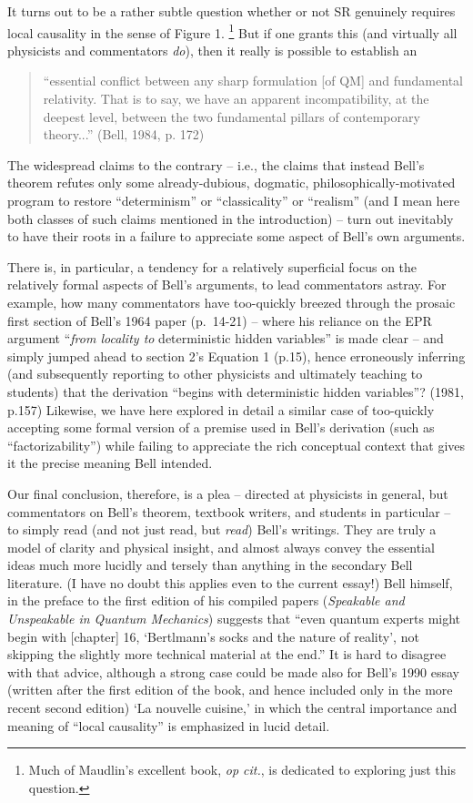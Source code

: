 \documentclass[12pt]{article}
\begin{document}
It turns out to be a rather subtle question whether or not SR
genuinely requires local causality in the sense of Figure 1.  
\footnote{Much of Maudlin's excellent book, \emph{op cit.}, is
  dedicated to exploring just this question.}
But if one grants this (and virtually all physicists and commentators
\emph{do}), then it really is possible to establish an 
\begin{quote}
``essential
conflict between any sharp formulation [of QM] and fundamental
relativity.  That is to say, we have an apparent incompatibility, at
the deepest level, between the two fundamental pillars of contemporary
theory...'' (Bell, 1984, p. 172)
\end{quote}
The widespread claims to the contrary -- i.e., the claims that instead
Bell's theorem refutes only some already-dubious, dogmatic,
philosophically-motivated program to restore ``determinism'' or
``classicality'' or ``realism'' (and I mean here both classes of such
claims mentioned in the introduction) -- turn out inevitably to have
their roots in a failure to appreciate some aspect of Bell's own
arguments.  

There is, in particular, a tendency for a relatively 
superficial focus on the relatively formal aspects of Bell's
arguments, to lead commentators astray.  For example, how many
commentators have too-quickly breezed through the prosaic first
section of Bell's 1964 paper (p.~14-21) -- where his reliance on the EPR
argument ``\emph{from locality to} deterministic hidden variables''
is made clear -- and simply jumped ahead to section 2's 
Equation 1 (p.15), hence erroneously inferring (and subsequently
reporting to other physicists and ultimately teaching to students) 
that the derivation ``begins with deterministic hidden variables''?  
(1981, p.157)  Likewise, we have here explored in detail 
a similar case of too-quickly accepting some formal version of a
premise used in Bell's derivation (such as ``factorizability'') 
while failing to appreciate the rich conceptual context that gives it
the precise meaning Bell intended.  

Our final conclusion, therefore, is a plea -- directed at physicists
in general, but commentators on Bell's theorem, textbook writers, and
students in particular -- to simply read (and not just read, but
\emph{read}) Bell's writings.  They are
truly a model of clarity and physical insight, and almost always
convey the essential ideas much more lucidly and tersely than anything
in the secondary Bell literature.  (I have no doubt this applies even to
the current essay!)  
Bell himself, in the preface to the first edition
of his compiled papers (\emph{Speakable and Unspeakable in Quantum
  Mechanics}) suggests that ``even quantum experts might begin with
[chapter] 16, `Bertlmann's socks and the nature of reality', not
skipping the slightly more technical material at the end.''  It is
hard to disagree with that advice, although a strong case could be
made also for Bell's 1990 essay (written after the first edition of
the book, and hence included only in the more recent second edition)
`La nouvelle cuisine,' in which the central importance and meaning of
``local causality'' is emphasized in lucid detail.  
\end{document}
